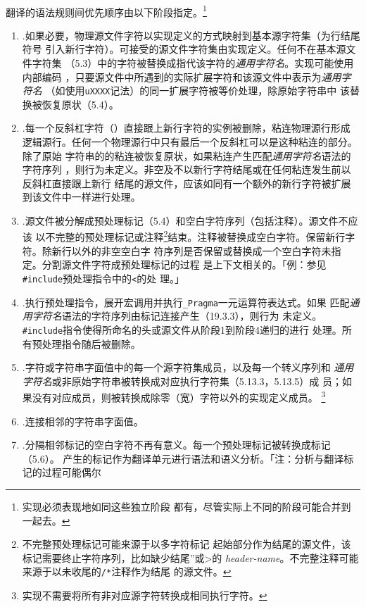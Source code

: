 \paragraph{}
翻译的语法规则间优先顺序由以下阶段指定。\footnote{实现必须表现地如同这些独立阶段
都有，尽管实际上不同的阶段可能合并到一起去。}
\begin{enumerate}[label={\arabic*}]
  \newcommand{\tpit}[1]{\item{\hspace{-0.5em}.#1\label{tpit\arabic{enumi}}}}
  \tpit{如果必要，物理源文件字符以实现定义的方式映射到基本源字符集（为行结尾符号
    引入新行字符）。可接受的源文件字符集由实现定义。任何不在基本源文件字符集
   （5.3）中的字符被替换成指代该字符的\textit{通用字符名}。实现可能使用内部编码
    ，只要源文件中所遇到的实际扩展字符和该源文件中表示为\textit{通用字符名}
    （如使用\texttt{\bs uXXXX}记法）的同一扩展字符被等价处理，除原始字符串中
    该替换被恢复原状（5.4）。}
  \tpit{每一个反斜杠字符（\bs）直接跟上新行字符的实例被删除，粘连物理源行形成
    逻辑源行。任何一个物理源行中只有最后一个反斜杠可以是这种粘连的部分。除了原始
    字符串的的粘连被恢复原状，如果粘连产生匹配\textit{通用字符名}语法的字符序列
    ，则行为未定义。非空及不以新行字符结尾或在任何粘连发生前以反斜杠直接跟上新行
    结尾的源文件，应该如同有一个额外的新行字符被扩展到该文件中一样进行处理。}
  \tpit{源文件被分解成预处理标记（5.4）和空白字符序列（包括注释）。源文件不应该
    以不完整的预处理标记或注释\footnote{不完整预处理标记可能来源于以多字符标记
    起始部分作为结尾的源文件，该标记需要终止字符序列，比如缺少结尾”或>的
    \textit{header-name}。不完整注释可能来源于以未收尾的\texttt{/*}注释作为结尾
    的源文件。}结束。注释被替换成空白字符。保留新行字符。除新行以外的非空空白字
    符序列是否保留或替换成一个空白字符未指定。分割源文件字符成预处理标记的过程
    是上下文相关的。「例：参见\texttt{\#include}预处理指令中的\texttt{<}的处
    理。」}
  \tpit{执行预处理指令，展开宏调用并执行\texttt{\_Pragma}一元运算符表达式。如果
    匹配\textit{通用字符名}语法的字符序列由标记连接产生（19.3.3），则行为
    未定义。\texttt{\#include}指令使得所命名的头或源文件从阶段1到阶段4递归的进行
    处理。所有预处理指令随后被删除。}
  \tpit{字符或字符串字面值中的每一个源字符集成员，以及每一个转义序列和
    \textit{通用字符名}或非原始字符串被转换成对应执行字符集（5.13.3，5.13.5）成
    员；如果没有对应成员，则被转换成除零（宽）字符以外的实现定义成员。
    \footnote{实现不需要将所有非对应源字符转换成相同执行字符。}}
  \tpit{连接相邻的字符串字面值。}
  \tpit{分隔相邻标记的空白字符不再有意义。每一个预处理标记被转换成标记（5.6）。
    产生的标记作为翻译单元进行语法和语义分析。「注：分析与翻译标记的过程可能偶尔
}
\end{enumerate}
